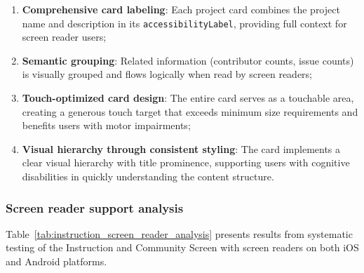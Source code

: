 \begin{enumerate}
    \item \textbf{Comprehensive card labeling}: Each project card combines the project name and description in its \texttt{accessibilityLabel}, providing full context for screen reader users;
    
    \item \textbf{Semantic grouping}: Related information (contributor counts, issue counts) is visually grouped and flows logically when read by screen readers;
    
    \item \textbf{Touch-optimized card design}: The entire card serves as a touchable area, creating a generous touch target that exceeds minimum size requirements and benefits users with motor impairments;
    
    \item \textbf{Visual hierarchy through consistent styling}: The card implements a clear visual hierarchy with title prominence, supporting users with cognitive disabilities in quickly understanding the content structure.
\end{enumerate}

\subsubsection{Screen reader support analysis}

Table~\ref{tab:instruction_screen_reader_analysis} presents results from systematic testing of the Instruction and Community Screen with screen readers on both iOS and Android platforms.

